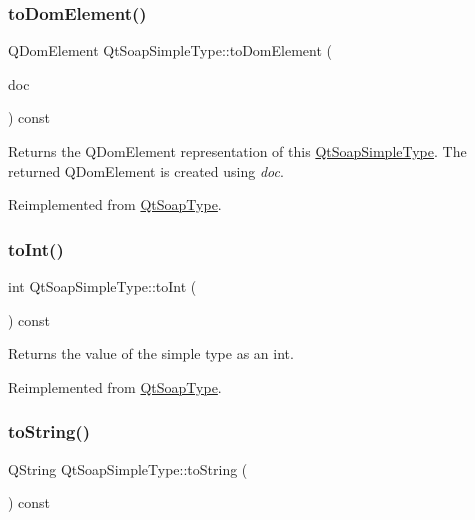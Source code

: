 \subsubsection{\texorpdfstring{to\+Dom\+Element()}{toDomElement()}}
{\footnotesize\ttfamily Q\+Dom\+Element Qt\+Soap\+Simple\+Type\+::to\+Dom\+Element (\begin{DoxyParamCaption}\item[{Q\+Dom\+Document}]{doc }\end{DoxyParamCaption}) const\hspace{0.3cm}{\ttfamily [virtual]}}

Returns the Q\+Dom\+Element representation of this \mbox{\hyperlink{class_qt_soap_simple_type}{Qt\+Soap\+Simple\+Type}}. The returned Q\+Dom\+Element is created using {\itshape doc}. 

Reimplemented from \mbox{\hyperlink{class_qt_soap_type_a77b7274ffbc9374187a2cc8cca27cdb6}{Qt\+Soap\+Type}}.

\mbox{\label{class_qt_soap_simple_type_a3308ce664e671f234e2f3a508d858b48}} 
\subsubsection{\texorpdfstring{to\+Int()}{toInt()}}
{\footnotesize\ttfamily int Qt\+Soap\+Simple\+Type\+::to\+Int (\begin{DoxyParamCaption}{ }\end{DoxyParamCaption}) const\hspace{0.3cm}{\ttfamily [virtual]}}

Returns the value of the simple type as an int. 

Reimplemented from \mbox{\hyperlink{class_qt_soap_type_a5a94747abe5773d9bc83aff7f7efe9ee}{Qt\+Soap\+Type}}.

\mbox{\label{class_qt_soap_simple_type_aeb17c8605fc09bcde232f11a6f91f775}} 
\subsubsection{\texorpdfstring{to\+String()}{toString()}}
{\footnotesize\ttfamily Q\+String Qt\+Soap\+Simple\+Type\+::to\+String (\begin{DoxyParamCaption}{ }\end{DoxyParamCaption}) const\hspace{0.3cm}{\ttfamily [virtual]}}

